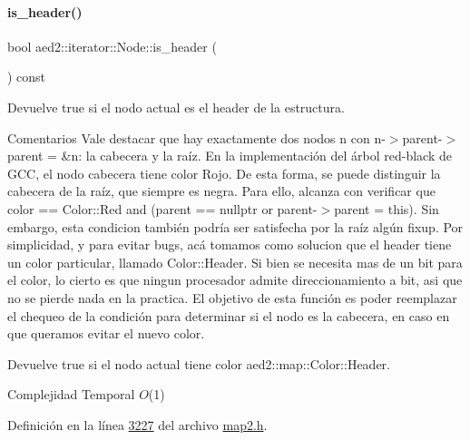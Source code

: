 \paragraph{\texorpdfstring{is\+\_\+header()}{is\_header()}}
{\footnotesize\ttfamily bool aed2\+::iterator\+::\+Node\+::is\+\_\+header (\begin{DoxyParamCaption}{ }\end{DoxyParamCaption}) const\hspace{0.3cm}{\ttfamily [inline]}}



Devuelve true si el nodo actual es el header de la estructura. 

\begin{DoxyRemark}{Comentarios}
Vale destacar que hay exactamente dos nodos n con n-\/$>$parent-\/$>$parent = \&n\+: la cabecera y la raíz. En la implementación del árbol red-\/black de G\+CC, el nodo cabecera tiene color Rojo. De esta forma, se puede distinguir la cabecera de la raíz, que siempre es negra. Para ello, alcanza con verificar que {\ttfamily color == Color\+::\+Red and (parent == nullptr or parent-\/$>$parent = this)}. Sin embargo, esta condicion también podría ser satisfecha por la raíz algún {\ttfamily fixup}. Por simplicidad, y para evitar bugs, acá tomamos como solucion que el header tiene un color particular, llamado Color\+::\+Header. Si bien se necesita mas de un bit para el color, lo cierto es que ningun procesador admite direccionamiento a bit, asi que no se pierde nada en la practica. El objetivo de esta función es poder reemplazar el chequeo de la condición para determinar si el nodo es la cabecera, en caso en que queramos evitar el nuevo color.
\end{DoxyRemark}
\begin{DoxyReturn}{Devuelve}
true si el nodo actual tiene color aed2\+::map\+::\+Color\+::\+Header.
\end{DoxyReturn}

\begin{DoxyDescription}
\item[Complejidad Temporal]$O$(1)
\end{DoxyDescription}

Definición en la línea \hyperlink{map2_8h_source_l03227}{3227} del archivo \hyperlink{map2_8h_source}{map2.\+h}.

\mbox{\label{structaed2_1_1iterator_1_1Node_a968601069822105337814f963d79d635_a968601069822105337814f963d79d635}} 
